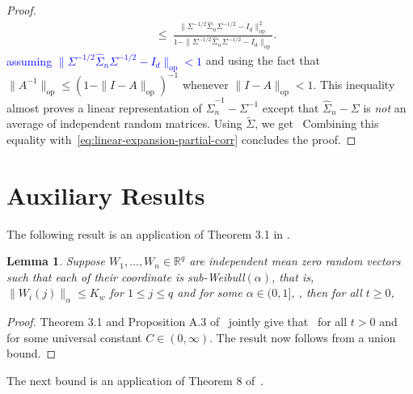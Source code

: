 \documentclass{article}
\newtheorem{lemma}{Lemma}
\begin{document}
\begin{appendices}
\begin{proof}
\begin{equation}
\begin{split}
 ~&\le~ \frac{\|\Sigma^{-1/2}\widehat{\Sigma}_n\Sigma^{-1/2} - I_d\|_{\mathrm{op}}^2}{1 - \|\Sigma^{-1/2}\widehat{\Sigma}_n\Sigma^{-1/2} - I_d\|_{\mathrm{op}}}.
 \end{split}
 \end{equation}
 \textcolor{blue}{assuming $\|\Sigma^{-1/2}\widehat{\Sigma}_n\Sigma^{-1/2} - I_d\|_{\mathrm{op}} < 1$} and using the fact that $\|A^{-1}\|_{\mathrm{op}} \le (1 - \|I - A\|_{\mathrm{op}})^{-1}$ whenever $\|I - A\|_{\mathrm{op}} < 1$.
 This inequality almost proves a linear representation of $\widehat{\Sigma}_n^{-1} - \Sigma^{-1}$ except that $\widehat{\Sigma}_n - \Sigma$ is \emph{not} an average of independent random matrices. Using $\widetilde{\Sigma}$, we get
 \ 
 Combining this equality with~\eqref{eq:linear-expansion-partial-corr} concludes the proof.
 \end{proof}
 
 
 
 \section{Auxiliary Results}
 \label{appendix:auxiliary}
 
 The following result is an application of Theorem 3.1 in \cite{KuchAbhi17}.
 
 \begin{lemma}\label{lemma:Thm3.1.KuchAbhi}
 Suppose $W_1, \ldots, W_n\in\mathbb{R}^q$ are independent mean zero random vectors such that each of their coordinate is sub-Weibull$(\alpha)$, that is, $\|W_i(j)\|_{\alpha} \le K_w$ for $1\le j\le q$ and for 
 some $\alpha\in (0, 1]$, , then for all $t\ge0$,
 \
 \end{lemma}
 \begin{proof}
 Theorem 3.1 and Proposition A.3 of~\cite{KuchAbhi17} jointly give that
 \
 for all $t > 0$ and for some universal constant $C\in(0, \infty)$. The result now follows from a union bound. 
 
 
 \end{proof}
 
 The next bound is an application of Theorem 8 of~\cite{Bouch05}.
 

\end{appendices}
\end{document}
